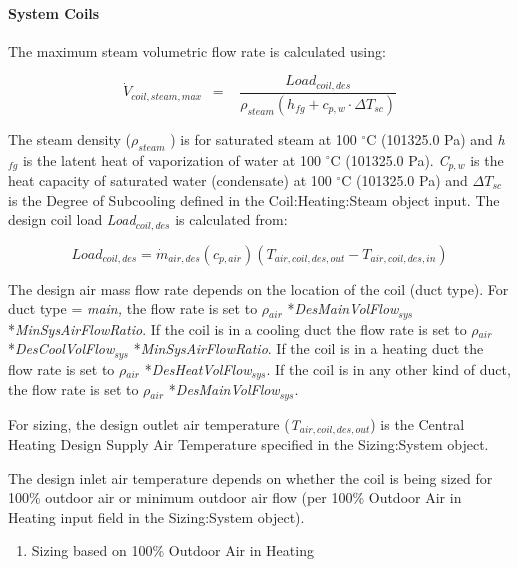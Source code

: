 \paragraph{System Coils}\label{system-coils-2}

The maximum steam volumetric flow rate is calculated using:

\begin{equation}
{\dot V_{coil,steam,max}}\,\,\, = \,\,\,\,\,\frac{{Loa{d_{coil,des}}}}{{{\rho_{steam}}\left( {{h_{fg}} + {c_{p,w}}\cdot \Delta {T_{sc}}} \right)}}
\end{equation}

The steam density (\({\rho_{steam}}\) ) is for saturated steam at 100 \(^{\circ}\)C (101325.0 Pa) and \emph{h\(_{fg}\)} is the latent heat of vaporization of water at 100 \(^{\circ}\)C (101325.0 Pa). \emph{C\(_{p,w}\)} is the heat capacity of saturated water (condensate) at 100 \(^{\circ}\)C (101325.0 Pa) and \(\Delta {T_{sc}}\) is the Degree of Subcooling defined in the Coil:Heating:Steam object input. The design coil load \emph{Load\(_{coil,des}\)} is calculated from:

\begin{equation}
Loa{d_{coil,des}} = {\dot m_{air,des}}({c_{p,air}})({T_{air,coil,des,out}} - {T_{air,coil,des,in}})
\end{equation}

The design air mass flow rate depends on the location of the coil (duct type). For duct type = \emph{main,} the flow rate is set to \emph{\(\rho\)\(_{air}\)} *\emph{DesMainVolFlow\(_{sys}\)} *\emph{MinSysAirFlowRatio}. If the coil is in a cooling duct the flow rate is set to \emph{\(\rho\)\(_{air}\)} *\emph{DesCoolVolFlow\(_{sys}\)} *\emph{MinSysAirFlowRatio}. If the coil is in a heating duct the flow rate is set to \emph{\(\rho\)\(_{air}\)} *\emph{DesHeatVolFlow\(_{sys}\)}. If the coil is in any other kind of duct, the flow rate is set to \emph{\(\rho\)\(_{air}\)} *\emph{DesMainVolFlow\(_{sys}\)}.

For sizing, the design outlet air temperature (\emph{T\(_{air,coil,des,out}\)}) is the Central Heating Design Supply Air Temperature specified in the Sizing:System object.

The design inlet air temperature depends on whether the coil is being sized for 100\% outdoor air or minimum outdoor air flow (per 100\% Outdoor Air in Heating input field in the Sizing:System object).

\begin{enumerate}
\def\labelenumi{\arabic{enumi})}
\tightlist
\item
  Sizing based on 100\% Outdoor Air in Heating
\end{enumerate}

